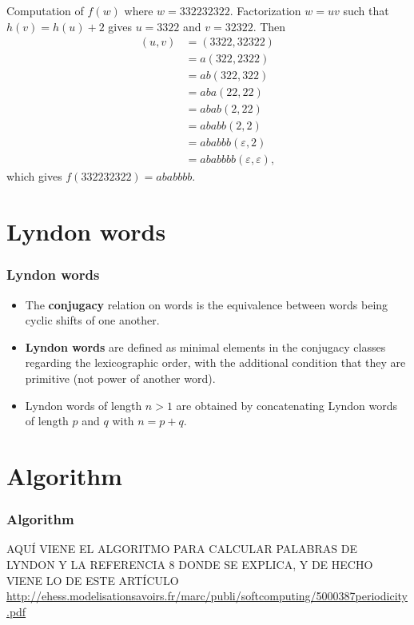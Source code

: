 \documentclass{beamer}
\theoremstyle{definition}
\begin{document}

\begin{frame}
\begin{example}
Computation of $f(w)$ where $w=332232322$. Factorization $w=uv$ such that $h(v)=h(u)+2$ gives $u=3322$ and $v=32322$. Then 
\begin{align*}
(u, v) &= (3322, 32322)\\
&= a(322, 2322)\\
&= ab(322, 322)\\
&= aba(22, 22)\\
&= abab(2, 22)\\
&= ababb(2, 2)\\
&= ababbb(\varepsilon, 2)\\
&= ababbbb(\varepsilon, \varepsilon),
\end{align*}
which gives $f(332232322)= ababbbb$.
\end{example}
\end{frame}
\section{Lyndon words}
\begin{frame}
\frametitle{Lyndon words}
\begin{itemize}
\item The \textbf{conjugacy} relation on words is the equivalence
between words being cyclic shifts of one another.
\item<2-> \textbf{Lyndon words} are defined as
minimal elements in the conjugacy classes regarding
the lexicographic order, with the additional condition
that they are primitive (not power of another word).
\item<3-> Lyndon words of length $n>1$ are
obtained by concatenating Lyndon words of length $p$
and $q$ with $n = p+q$.

\end{itemize}

\end{frame}

\section{Algorithm}
\begin{frame}
\frametitle{Algorithm}

AQUÍ VIENE EL ALGORITMO PARA CALCULAR PALABRAS DE LYNDON Y LA REFERENCIA 8 DONDE SE EXPLICA, Y DE HECHO VIENE LO DE ESTE ARTÍCULO
\url{http://ehess.modelisationsavoirs.fr/marc/publi/softcomputing/5000387periodicity.pdf}

\end{frame}
\end{document}
